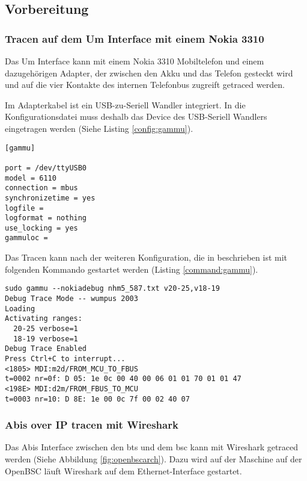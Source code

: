 \label{sec:analyse}

\subsection{Vorbereitung}
\subsubsection{Tracen auf dem Um Interface mit einem Nokia 3310}\label{sec:umtrace}
Das Um Interface kann mit einem Nokia 3310 Mobiltelefon und einem dazugehörigen Adapter, der zwischen den Akku und das Telefon gesteckt wird und auf die vier Kontakte des internen Telefonbus zugreift getraced werden.

Im Adapterkabel ist ein USB-zu-Seriell Wandler integriert. In die Konfigurationsdatei muss deshalb das Device des USB-Seriell Wandlers eingetragen werden (Siehe Listing \ref{config:gammu}).

\begin{lstlisting}[label=config:gammu,caption={Konfigurationsdatei für gammu und dem verwendeten Adapter}]
[gammu]

port = /dev/ttyUSB0
model = 6110
connection = mbus
synchronizetime = yes
logfile = 
logformat = nothing
use_locking = yes
gammuloc = 
\end{lstlisting}

Das Tracen kann nach der weiteren Konfiguration, die in \cite{bib:nokiagammu} beschrieben ist mit folgenden Kommando gestartet werden (Listing \ref{command:gammu}).

\begin{lstlisting}[label=command:gammu,caption={Aufruf von Gammu}]
sudo gammu --nokiadebug nhm5_587.txt v20-25,v18-19
Debug Trace Mode -- wumpus 2003
Loading
Activating ranges:
  20-25 verbose=1
  18-19 verbose=1
Debug Trace Enabled
Press Ctrl+C to interrupt...
<1805> MDI:m2d/FROM_MCU_TO_FBUS
t=0002 nr=0f: D 05: 1e 0c 00 40 00 06 01 01 70 01 01 47 
<198E> MDI:d2m/FROM_FBUS_TO_MCU
t=0003 nr=10: D 8E: 1e 00 0c 7f 00 02 40 07 
\end{lstlisting}

\subsubsection{Abis over IP tracen mit Wireshark}\label{sec:abistrace}
Das Abis Interface zwischen den \gls{bts} und dem \gls{bsc} kann mit Wireshark getraced werden (Siehe Abbildung \ref{fig:openbscarch}). Dazu wird auf der Maschine auf der OpenBSC läuft Wireshark auf dem Ethernet-Interface gestartet.

